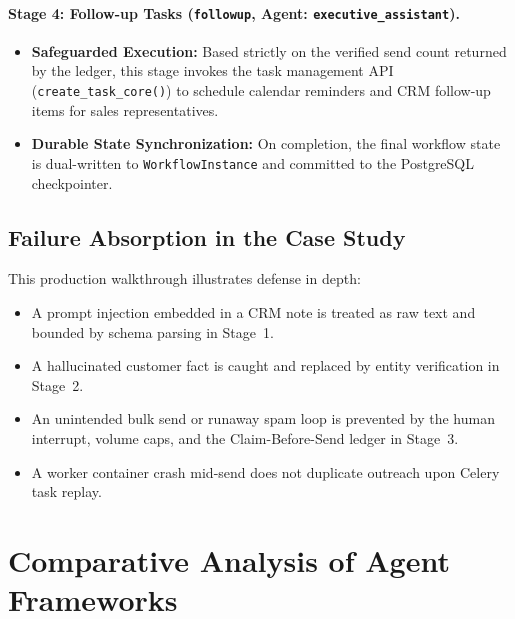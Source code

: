 \documentclass[10pt,a4paper,twocolumn]{article}
\begin{document}
\paragraph{Stage 4: Follow-up Tasks (\texttt{followup}, Agent: \texttt{executive\_assistant}).}
\begin{itemize}[leftmargin=*]
  \item \textbf{Safeguarded Execution:} Based strictly on the verified send count returned by the ledger, this stage invokes the task management API (\texttt{create\_task\_core()}) to schedule calendar reminders and CRM follow-up items for sales representatives.
  \item \textbf{Durable State Synchronization:} On completion, the final workflow state is dual-written to \texttt{WorkflowInstance} and committed to the PostgreSQL checkpointer.
\end{itemize}

\subsection{Failure Absorption in the Case Study}
This production walkthrough illustrates defense in depth:
\begin{itemize}[leftmargin=*]
  \item A prompt injection embedded in a CRM note is treated as raw text and bounded by schema parsing in Stage~1.
  \item A hallucinated customer fact is caught and replaced by entity verification in Stage~2.
  \item An unintended bulk send or runaway spam loop is prevented by the human interrupt, volume caps, and the Claim-Before-Send ledger in Stage~3.
  \item A worker container crash mid-send does not duplicate outreach upon Celery task replay.
\end{itemize}

\section{Comparative Analysis of Agent Frameworks}
\label{sec:compare}
\end{document}
